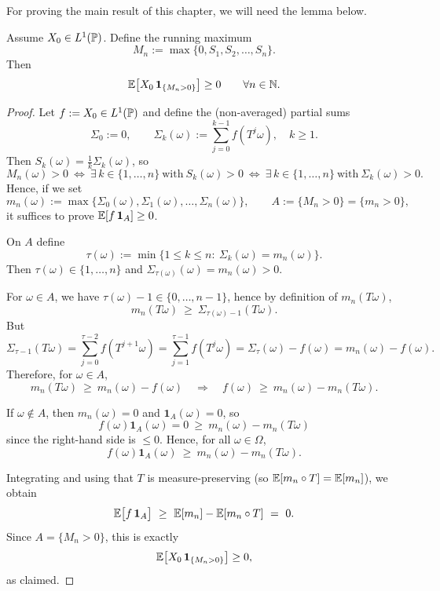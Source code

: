 For proving the main result of this chapter, we will need the lemma below. 

\begin{lemma}
Assume \(X_0\in L^1(\mathbb{P})\). Define the running maximum
\[
M_n := \max\{0,S_1,S_2,\dots,S_n\}.
\]
Then
\[
\mathbb{E}\bigl[ X_0\, \mathbf{1}_{\{M_n>0\}} \bigr] \ge 0
\qquad \forall n\in\mathbb{N}.
\]
\end{lemma}

\begin{proof}
Let $f:=X_0\in L^1(\mathbb{P})$ and define the (non-averaged) partial sums
\[
\Sigma_0:=0,
\qquad
\Sigma_k(\omega):=\sum_{j=0}^{k-1} f(T^j\omega),\quad k\ge 1.
\]
Then $S_k(\omega)=\frac{1}{k}\Sigma_k(\omega)$, so
\[
M_n(\omega)>0
\ \Longleftrightarrow\
\exists\,k\in\{1,\dots,n\}\ \text{with}\ S_k(\omega)>0
\ \Longleftrightarrow\
\exists\,k\in\{1,\dots,n\}\ \text{with}\ \Sigma_k(\omega)>0.
\]
Hence, if we set
\[
m_n(\omega):=\max\{\Sigma_0(\omega),\Sigma_1(\omega),\dots,\Sigma_n(\omega)\},
\qquad
A:=\{M_n>0\}=\{m_n>0\},
\]
it suffices to prove $\mathbb{E}[f\,\mathbf 1_A]\ge 0$.

\medskip
{}
On $A$ define
\[
\tau(\omega):=\min\{1\le k\le n:\ \Sigma_k(\omega)=m_n(\omega)\}.
\]
Then $\tau(\omega)\in\{1,\dots,n\}$ and $\Sigma_{\tau(\omega)}(\omega)=m_n(\omega)>0$.

\medskip
{}
For $\omega\in A$, we have $\tau(\omega)-1\in\{0,\dots,n-1\}$, hence by definition of $m_n(T\omega)$,
\[
m_n(T\omega)\ \ge\ \Sigma_{\tau(\omega)-1}(T\omega).
\]
But
\[
\Sigma_{\tau-1}(T\omega)
=\sum_{j=0}^{\tau-2} f(T^{j+1}\omega)
=\sum_{j=1}^{\tau-1} f(T^{j}\omega)
=\Sigma_\tau(\omega)-f(\omega)
=m_n(\omega)-f(\omega).
\]
Therefore, for $\omega\in A$,
\[
m_n(T\omega)\ \ge\ m_n(\omega)-f(\omega)
\quad\Longrightarrow\quad
f(\omega)\ \ge\ m_n(\omega)-m_n(T\omega).
\]

\medskip
{}
If $\omega\notin A$, then $m_n(\omega)=0$ and $\mathbf 1_A(\omega)=0$, so
\[
f(\omega)\mathbf 1_A(\omega)=0\ \ge\ m_n(\omega)-m_n(T\omega)
\]
since the right-hand side is $\le 0$. Hence, for all $\omega\in\Omega$,
\[
f(\omega)\mathbf 1_A(\omega)\ \ge\ m_n(\omega)-m_n(T\omega).
\]

\medskip
{}
Integrating and using that $T$ is measure-preserving (so $\mathbb{E}[m_n\circ T]=\mathbb{E}[m_n]$), we obtain
\[
\mathbb{E}\bigl[f\,\mathbf 1_A\bigr]
\ \ge\
\mathbb{E}[m_n]-\mathbb{E}[m_n\circ T]
\ =\ 0.
\]
Since $A=\{M_n>0\}$, this is exactly
\[
\mathbb{E}\bigl[X_0\,\mathbf 1_{\{M_n>0\}}\bigr]\ge 0,
\]
as claimed.
\end{proof}


